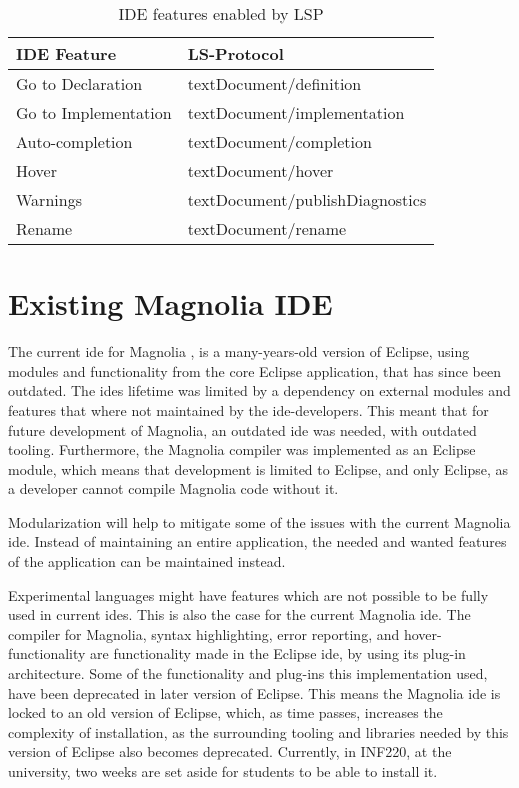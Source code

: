 \begin{table}[]
  \centering
  \caption{IDE features enabled by LSP}
  \label{tbl:ide}
  \begin{tabular}{|l|l|}
    \hline
    IDE Feature & LS-Protocol \\ \hline
    Go to Declaration & textDocument/definition \\ \hline
    Go to Implementation & textDocument/implementation \\ \hline
    Auto-completion & textDocument/completion \\ \hline
    Hover & textDocument/hover \\ \hline
    Warnings & textDocument/publishDiagnostics \\ \hline
    Rename & textDocument/rename \\ \hline
  \end{tabular}
\end{table}

\section{Existing Magnolia IDE}

The current \gls{ide} for Magnolia \cite{baggeIde}, is a many-years-old version
of Eclipse, using modules and functionality from the core Eclipse application,
that has since been outdated. The \gls{ide}s lifetime was limited by a
dependency on external modules and features that where not maintained by the
\gls{ide}-developers. This meant that for future development of Magnolia, an
outdated \gls{ide} was needed, with outdated tooling. Furthermore, the Magnolia
compiler was implemented as an Eclipse module, which means that development is
limited to Eclipse, and only Eclipse, as a developer cannot compile Magnolia
code without it.

Modularization will help to mitigate some of the issues with the current
Magnolia \gls{ide}. Instead of maintaining an entire application, the needed and
wanted features of the application can be maintained instead.

Experimental languages might have features which are not possible to be fully
used in current \gls{ide}s. This is also the case for the current Magnolia
\gls{ide}. The compiler for Magnolia, syntax highlighting, error reporting, and
hover-functionality are functionality made in the Eclipse \gls{ide}, by using
its plug-in architecture. Some of the functionality and plug-ins this
implementation used, have been deprecated in later version of Eclipse. This
means the Magnolia \gls{ide} is locked to an old version of Eclipse, which, as
time passes, increases the complexity of installation, as the surrounding
tooling and libraries needed by this version of Eclipse also becomes deprecated.
Currently, in INF220, at the university, two weeks are set aside for students to
be able to install it.
